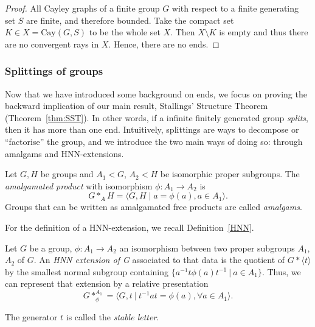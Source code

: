 \begin{proof} %
    All Cayley graphs of a finite group \(G\) with respect to a finite generating set \(S\) are finite, and therefore bounded. Take the compact set \(K \in X = \mathrm{Cay}(G,S)\) to be the whole set \(X\). Then \(X \setminus K\) is empty and thus there are no convergent rays in \(X\). Hence, there are no ends.
\end{proof}

\subsubsection{Splittings of groups}
Now that we have introduced some background on ends, we focus on proving the backward implication of our main result, Stallings' Structure Theorem (Theorem~\ref{thm:SST}). In other words, if a infinite finitely generated group \emph{splits}, then it has more than one end. Intuitively, splittings are ways to decompose or ``factorise'' the group, and we introduce the two main ways of doing so: through amalgams and HNN-extensions.

 \begin{definition}\label{defnamalgamatedproduct}
     Let \(G,H\) be groups and \(A_1 < G\), \(A_2 < H\) be isomorphic proper subgroups. The \emph{amalgamated product} with isomorphism \(\phi: A_1 \to A_2\) is 
     \[
     G *_A H = \langle G,H \mid a = \phi(a), a \in A_1 \rangle .
     \]
     Groups that can be written as amalgamated free products are called \emph{amalgams}.
 \end{definition}

For the definition of a HNN-extension, we recall Definition~\ref{HNN}.

 \begin{definition}
     Let $G$ be a group, $\phi: A_1 \to A_2$ an isomorphism between two proper subgroups $A_1$,$A_2$ of $G$. An \emph{HNN extension of G} associated to that data is the quotient of $G \ast \langle t \rangle$ by the smallest normal subgroup containing $\{a^{-1}t\phi(a)t^{-1} \: | \: a \in A_1 \}$. Thus, we can represent that extension by a relative presentation 
    \[G \ast_\phi^{A_1} = \langle G,t \: | \: t^{-1}at = \phi(a), \forall a \in A_1 \rangle. \]

    The generator \(t\) is called the \emph{stable letter}.
 \end{definition}

